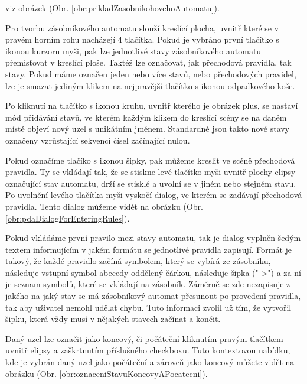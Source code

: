 viz obrázek (Obr. \ref{obr:prikladZasobnikohovehoAutomatu}). 


Pro tvorbu zásobníkového automatu slouží kreslící plocha, uvnitř které se v pravém horním rohu nacházejí 4 tlačítka. Pokud je vybráno první tlačítko s ikonou kurzoru myši, pak lze jednotlivé stavy zásobníkového automatu přemisťovat v kreslící ploše. Taktéž lze označovat, jak přechodová pravidla, tak stavy. Pokud máme označen jeden nebo více stavů, nebo přechodových pravidel, lze je smazat jediným klikem na nejpravější tlačítko s ikonou odpadkového koše.

Po kliknutí na tlačítko s ikonou kruhu, uvnitř kterého je obrázek plus, se nastaví mód přidávání stavů, ve kterém každým klikem do kreslící scény se na daném místě objeví nový uzel s unikátním jménem. Standardně jsou takto nové stavy označeny vzrůstající sekvencí čísel začínající nulou.

Pokud označíme tlačíko s ikonou šipky, pak můžeme kreslit ve scéně přechodová pravidla. Ty se vkládají tak, že se stiskne levé tlačítko myši uvnitř plochy elipsy označující stav automatu, drží se stisklé a uvolní se v jiném nebo stejném stavu. Po uvolnění levého tlačítka myši vyskočí dialog, ve kterém se zadávají přechodová pravidla. Tento dialog můžeme vidět na obrázku (Obr. \ref{obr:pdaDialogForEnteringRules}). 


Pokud vkládáme první pravilo mezi stavy automatu, tak je dialog vyplněn šedým textem informujícím v jakém formátu se jednotlivé pravidla zapisují.
Formát je takový, že každé pravidlo začíná symbolem, který se vybírá ze zásobníku, následuje vstupní symbol abecedy oddělený čárkou, následuje šipka ("->") a za ní je seznam symbolů, které se vkládají na zásobník. Záměrně se zde nezapisuje z jakého na jaký stav se má zásobníkový automat přesunout po provedení pravidla, tak aby uživatel nemohl udělat chybu. Tuto informaci zvolil už tím, že vytvořil šipku, která vždy musí v nějakých stavech začínat a končit.

Daný uzel lze označit jako koncový, či počáteční kliknutím pravým tlačítkem uvnitř elipsy a zaškrtnutím příslušného checkboxu. Tuto kontextovou nabídku, kde je vybrán daný uzel jako počáteční a zároveň jako koncový můžete vidět na obrázku (Obr. \ref{obr:oznaceniStavuKoncovyAPocatecni}).

